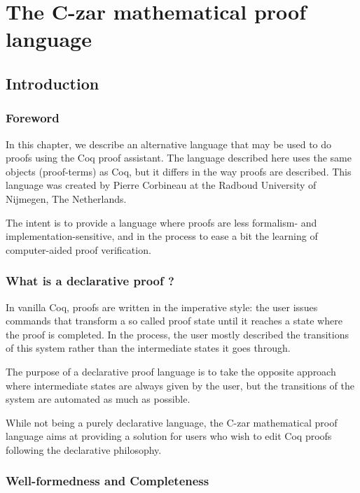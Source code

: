 \newcommand{\DPL}{C-zar mathematical proof language}

\chapter{The \DPL\label{DPL}}

\section{Introduction}

\subsection{Foreword}

In this chapter, we describe an alternative language that may be used
to do proofs using the Coq proof assistant.  The language described
here uses the same objects (proof-terms) as Coq, but it differs in the
way proofs are described. This language was created by Pierre
Corbineau at the Radboud University of Nijmegen, The Netherlands.

The intent is to provide a language where proofs are less formalism-{}
and implementation-{}sensitive, and in the process to ease a bit the
learning of computer-{}aided proof verification.

\subsection{What is a declarative proof ?{}}
In vanilla Coq, proofs are written in the imperative style: the user
issues commands that transform a so called proof state until it
reaches a state where the proof is completed. In the process, the user
mostly described the transitions of this system rather than the
intermediate states it goes through.

The purpose of a declarative proof language is to take the opposite
approach where intermediate states are always given by the user, but
the transitions of the system are automated as much as possible.

While not being a purely declarative language, the \DPL{} aims at
providing a solution for users who wish to edit Coq proofs following
the declarative philosophy.

\subsection{Well-formedness and Completeness}

